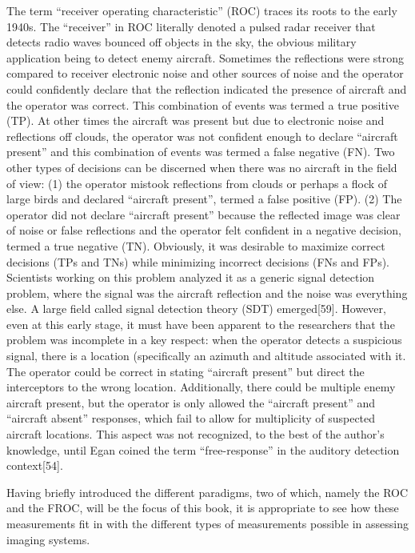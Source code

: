 \documentclass[
]{book}
\begin{document}
The term ``receiver operating characteristic'' (ROC) traces its roots to the early 1940s. The ``receiver'' in ROC literally denoted a pulsed radar receiver that detects radio waves bounced off objects in the sky, the obvious military application being to detect enemy aircraft. Sometimes the reflections were strong compared to receiver electronic noise and other sources of noise and the operator could confidently declare that the reflection indicated the presence of aircraft and the operator was correct. This combination of events was termed a true positive (TP). At other times the aircraft was present but due to electronic noise and reflections off clouds, the operator was not confident enough to declare ``aircraft present'' and this combination of events was termed a false negative (FN). Two other types of decisions can be discerned when there was no aircraft in the field of view: (1) the operator mistook reflections from clouds or perhaps a flock of large birds and declared ``aircraft present'', termed a false positive (FP). (2) The operator did not declare ``aircraft present'' because the reflected image was clear of noise or false reflections and the operator felt confident in a negative decision, termed a true negative (TN). Obviously, it was desirable to maximize correct decisions (TPs and TNs) while minimizing incorrect decisions (FNs and FPs). Scientists working on this problem analyzed it as a generic signal detection problem, where the signal was the aircraft reflection and the noise was everything else. A large field called signal detection theory (SDT) emerged{[}59{]}. However, even at this early stage, it must have been apparent to the researchers that the problem was incomplete in a key respect: when the operator detects a suspicious signal, there is a location (specifically an azimuth and altitude associated with it. The operator could be correct in stating ``aircraft present'' but direct the interceptors to the wrong location. Additionally, there could be multiple enemy aircraft present, but the operator is only allowed the ``aircraft present'' and ``aircraft absent'' responses, which fail to allow for multiplicity of suspected aircraft locations. This aspect was not recognized, to the best of the author's knowledge, until Egan coined the term ``free-response'' in the auditory detection context{[}54{]}.

Having briefly introduced the different paradigms, two of which, namely the ROC and the FROC, will be the focus of this book, it is appropriate to see how these measurements fit in with the different types of measurements possible in assessing imaging systems.
\end{document}
